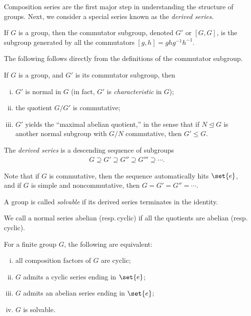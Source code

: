 \documentclass[10pt]{mypackage}
\begin{document}
Composition series are the first major step in understanding the structure of groups. Next, we consider a special series known as the \textit{derived series}.
\begin{definition}
  If $G$ is a group, then the commutator subgroup, denoted $G'$ or $\left[ G,G \right]$, is the subgroup generated by all the commutators $\left[ g,h \right] = ghg^{-1}h^{-1}$.
\end{definition}
The following follows directly from the definitions of the commutator subgroup.
\begin{theorem}
  If $G$ is a group, and $G'$ is its commutator subgroup, then
  \begin{enumerate}[(i)]
    \item $G'$ is normal in $G$ (in fact, $G'$ is \textit{characteristic} in $G$);
    \item the quotient $G/G'$ is commutative;
    \item $G'$ yields the ``maximal abelian quotient,'' in the sense that if $N\trianglelefteq G$ is another normal subgroup with $G/N$ commutative, then $G'\leq G$.
  \end{enumerate}
\end{theorem}
\begin{definition}
  The \textit{derived series} is a descending sequence of subgroups
  \begin{align*}
    G\supseteq G' \supseteq G'' \supseteq G''' \supseteq \cdots.
  \end{align*}
\end{definition}
Note that if $G$ is commutative, then the sequence automatically hits $\set{e}$, and if $G$ is simple and noncommutative, then $G = G' = G'' = \cdots$.
\begin{definition}
  A group is called \textit{solvable} if its derived series terminates in the identity.
\end{definition}
We call a normal series abelian (resp.\,cyclic) if all the quotients are abelian (resp.\,cyclic).
\begin{proposition}
  For a finite group $G$, the following are equivalent:
  \begin{enumerate}[(i)]
    \item all composition factors of $G$ are cyclic;
    \item $G$ admits a cyclic series ending in $\set{e}$;
    \item $G$ admits an abelian series ending in $\set{e}$;
    \item $G$ is solvable.
  \end{enumerate}
\end{proposition}
\end{document}
